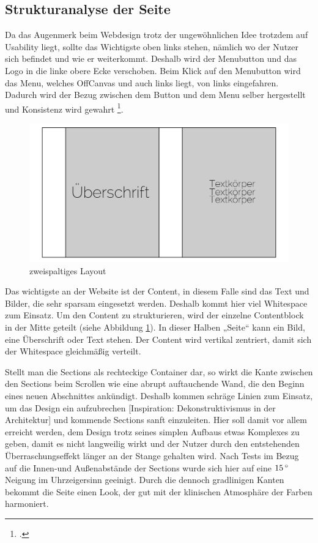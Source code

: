 	\subsection{Strukturanalyse der Seite}

Da das Augenmerk beim Webdesign trotz der ungewöhnlichen Idee trotzdem auf Usability liegt, sollte das Wichtigste oben links stehen, nämlich wo der Nutzer sich befindet und wie er weiterkommt. Deshalb wird der Menubutton und das Logo in die linke obere Ecke verschoben. Beim Klick auf den Menubutton wird das Menu, welches OffCanvas und auch links liegt, von links eingefahren. Dadurch wird der Bezug zwischen dem Button und dem Menu selber hergestellt und Konsistenz wird gewahrt \footcite[vgl.][]{MaterialD:menu}.
 \begin{figure} [htp]
\includegraphics[width=\textwidth]{./img/inno_struct1.png}
\caption{zweispaltiges Layout}
\label{inno_Struct1}
\end{figure}
Das wichtigste an der Website ist der Content, in diesem Falle sind das Text und Bilder, die sehr sparsam eingesetzt werden. Deshalb kommt hier viel Whitespace zum Einsatz. Um den Content zu strukturieren, wird der einzelne Contentblock in der Mitte geteilt (siehe Abbildung \ref{inno_Struct1}). In dieser Halben „Seite“ kann ein Bild, eine Überschrift oder Text stehen. Der Content wird vertikal zentriert, damit sich der Whitespace gleichmäßig verteilt.

Stellt man die Sections als rechteckige Container dar, so wirkt die Kante zwischen den Sections beim Scrollen wie eine abrupt auftauchende Wand, die den Beginn eines neuen Abschnittes ankündigt. Deshalb kommen schräge Linien zum Einsatz, um das Design ein aufzubrechen [Inspiration: Dekonstruktivismus in der Architektur] und kommende Sections sanft einzuleiten. Hier soll damit vor allem erreicht werden, dem Design trotz seines simplen Aufbaus etwas Komplexes zu geben, damit es nicht langweilig wirkt und der Nutzer durch den entstehenden Überraschungseffekt länger an der Stange gehalten wird. Nach Tests im Bezug auf die Innen-und Außenabstände der Sections wurde sich hier auf eine $15\,^{\circ}{\rm}$ Neigung im Uhrzeigersinn geeinigt. Durch die dennoch gradlinigen Kanten bekommt die Seite einen Look, der gut mit der klinischen Atmosphäre der Farben harmoniert. 


